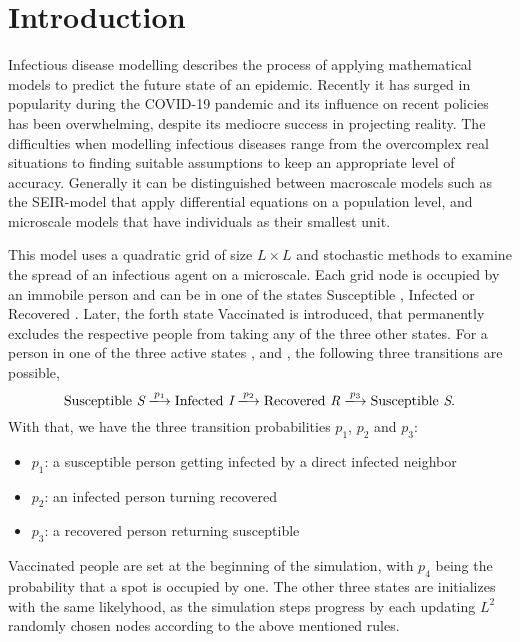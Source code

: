 \section{Introduction}


Infectious disease modelling describes the process of applying mathematical models to predict the future state of an epidemic. 
Recently it has surged in popularity during the COVID-19 pandemic and its influence on recent policies has been overwhelming, despite its mediocre success in projecting reality. 
The difficulties when modelling infectious diseases range from the overcomplex real situations to finding suitable assumptions to keep an appropriate level of accuracy.
Generally it can be distinguished between macroscale models such as the SEIR-model\cite{SEIR_Heidelberg} that apply differential equations on a population level, 
and microscale models that have individuals as their smallest unit.

This model uses a quadratic grid of size $L\times L$ and stochastic methods to examine the spread of an infectious agent on a microscale. Each grid node is occupied by an immobile person and can be in one of the states
Susceptible \susceptible{}, Infected \infected{} or Recovered \recovered{}. Later, the forth state Vaccinated \vaccinated{} is introduced, that permanently excludes the respective people from taking any of the three other states. 
For a person in one of the three active states \susceptible{}, \infected{} and \recovered{}, the following three transitions are possible,
\begin{equation*}
    \mathrm{Susceptible}~\susceptible\xlongrightarrow{p_1}\mathrm{Infected}~\infected{}\xlongrightarrow{p_2}\mathrm{Recovered}~\recovered{}\xlongrightarrow{p_3}\mathrm{Susceptible}~\susceptible{}.
\end{equation*}
With that, we have the three transition probabilities $p_1$, $p_2$ and $p_3$:
\begin{itemize}
    \item $p_1$: a susceptible person getting infected by a direct infected neighbor
    \item $p_2$: an infected person turning recovered
    \item $p_3$: a recovered person returning susceptible
\end{itemize}
Vaccinated people \vaccinated{} are set at the beginning of the simulation, with $p_4$ being the probability that a spot is occupied by one. The other three states are initializes with the same likelyhood, as the 
simulation steps progress by each updating $L^2$ randomly chosen nodes according to the above mentioned rules.

